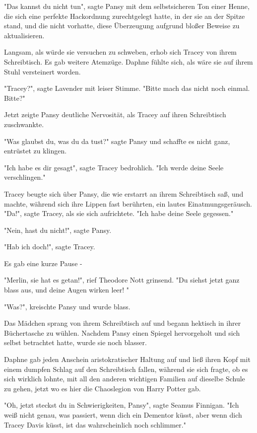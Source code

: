 {"Das kannst du nicht tun", sagte Pansy mit dem selbstsicheren Ton einer Henne, die sich eine perfekte Hackordnung zurechtgelegt hatte, in der sie an der Spitze stand, und die nicht vorhatte, diese Überzeugung aufgrund bloßer Beweise zu aktualisieren.

Langsam, als würde sie versuchen zu schweben, erhob sich Tracey von ihrem Schreibtisch. Es gab weitere Atemzüge. Daphne fühlte sich, als wäre sie auf ihrem Stuhl versteinert worden.

"Tracey?", sagte Lavender mit leiser Stimme. "Bitte mach das nicht noch einmal. Bitte?"

Jetzt zeigte Pansy deutliche Nervosität, als Tracey auf ihren Schreibtisch zuschwankte.

"Was glaubst du, was du da tust?" sagte Pansy und schaffte es nicht ganz, entrüstet zu klingen.

"Ich habe es dir gesagt", sagte Tracey bedrohlich. "Ich werde deine Seele verschlingen."

Tracey beugte sich über Pansy, die wie erstarrt an ihrem Schreibtisch saß, und machte, während sich ihre Lippen fast berührten, ein lautes Einatmungsgeräusch. "Da!", sagte Tracey, als sie sich aufrichtete. "Ich habe deine Seele gegessen."

"Nein, hast du nicht!", sagte Pansy.

"Hab ich doch!", sagte Tracey.

Es gab eine kurze Pause -

"Merlin, sie hat es getan!", rief Theodore Nott grinsend. "Du siehst jetzt ganz blass aus, und deine Augen wirken leer! "

"Was?", kreischte Pansy und wurde blass.

Das Mädchen sprang von ihrem Schreibtisch auf und begann hektisch in ihrer Büchertasche zu wühlen. Nachdem Pansy einen Spiegel hervorgeholt und sich selbst betrachtet hatte, wurde sie noch blasser.

Daphne gab jeden Anschein aristokratischer Haltung auf und ließ ihren Kopf mit einem dumpfen Schlag auf den Schreibtisch fallen, während sie sich fragte, ob es sich wirklich lohnte, mit all den anderen wichtigen Familien auf dieselbe Schule zu gehen, jetzt wo es hier die Chaoslegion von Harry Potter gab.

"Oh, jetzt steckst du in Schwierigkeiten, Pansy", sagte Seamus Finnigan. "Ich weiß nicht genau, was passiert, wenn dich ein Dementor küsst, aber wenn dich Tracey Davis küsst, ist das wahrscheinlich noch schlimmer."

}
